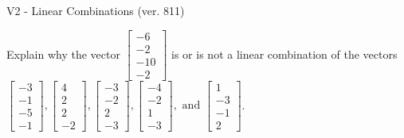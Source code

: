 \begin{exercise}
  \begin{exerciseTitle}V2 - Linear Combinations (ver. 811)\end{exerciseTitle}
  \begin{exerciseStatement}
    Explain why the vector \(\left[\begin{array}{c}
-6 \\
-2 \\
-10 \\
-2
\end{array}\right]\)  is or is not a linear 
	combination of the vectors \(\left[\begin{array}{c}
-3 \\
-1 \\
-5 \\
-1
\end{array}\right] , \left[\begin{array}{c}
4 \\
2 \\
2 \\
-2
\end{array}\right] , \left[\begin{array}{c}
-3 \\
-2 \\
2 \\
-3
\end{array}\right] , \left[\begin{array}{c}
-4 \\
-2 \\
1 \\
-3
\end{array}\right] , \text{ and } \left[\begin{array}{c}
1 \\
-3 \\
-1 \\
2
\end{array}\right]\).
	



\end{exerciseStatement}
\end{exercise}
